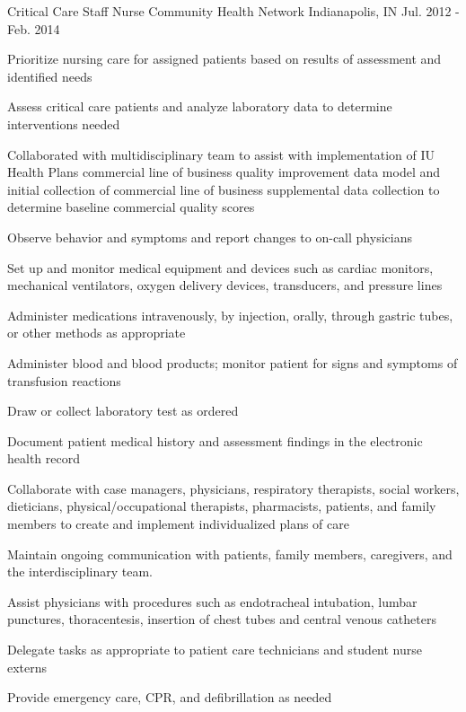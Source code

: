 \begin{cventries}
  \cventry
    {Critical Care Staff Nurse} %
    {Community Health Network} %
    {Indianapolis, IN} %
    {Jul. 2012 - Feb. 2014} %
    {
      \begin{cvitems} %
        \item {Prioritize nursing care for assigned patients based on results of assessment and identified needs}
        \item {Assess critical care patients and analyze laboratory data to determine interventions needed}
        \item {Collaborated with multidisciplinary team to assist with implementation of IU Health Plans commercial line of business quality improvement data model and initial collection of commercial line of business supplemental data collection to determine baseline commercial quality scores}
        \item {Observe behavior and symptoms and report changes to on-call physicians}
        \item {Set up and monitor medical equipment and devices such as cardiac monitors, mechanical ventilators, oxygen delivery devices, transducers, and pressure lines}
        \item {Administer medications intravenously, by injection, orally, through gastric tubes, or other methods as appropriate}
        \item {Administer blood and blood products; monitor patient for signs and symptoms of transfusion reactions}
        \item {Draw or collect laboratory test as ordered}
        \item {Document patient medical history and assessment findings in the electronic health record}
        \item {Collaborate with case managers, physicians, respiratory therapists, social workers, dieticians, physical/occupational therapists, pharmacists, patients, and family members to create and implement individualized plans of care}
        \item {Maintain ongoing communication with patients, family members, caregivers, and the interdisciplinary team.}
        \item {Assist physicians with procedures such as endotracheal intubation, lumbar punctures, thoracentesis, insertion of chest tubes and central venous catheters}
        \item {Delegate tasks as appropriate to patient care technicians and student nurse externs}
        \item {Provide emergency care, CPR, and defibrillation as needed}
      \end{cvitems}
    }


\end{cventries}
